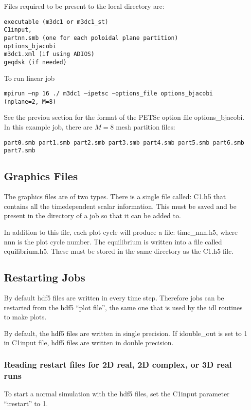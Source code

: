 \noindent
Files required to be present to the local directory are:
\begin{verbatim}
executable (m3dc1 or m3dc1_st)
C1input,
partnn.smb (one for each poloidal plane partition)
options_bjacobi
m3dc1.xml (if using ADIOS)
geqdsk (if needed)
\end{verbatim}

\noindent
To run linear job
\begin{verbatim}
mpirun –np 16 ./ m3dc1 –ipetsc –options_file options_bjacobi (nplane=2, M=8)
\end{verbatim}
\noindent
See the previou section for the format of the PETSc option file options\_bjacobi. In this example job, there are $M=8$ mesh partition files:
\begin{verbatim}
part0.smb part1.smb part2.smb part3.smb part4.smb part5.smb part6.smb part7.smb
\end{verbatim}

\subsection{Graphics Files}
\noindent
The graphics files are of two types. There is a single file called: C1.h5 that contains all the timedependent scalar information. This must be saved and be present in the directory of a job so that it can be added to.

\noindent
In addition to this file, each plot cycle will produce a file: time\_nnn.h5, where nnn is the plot cycle
number. The equilibrium is written into a file called equilibrium.h5. These must be stored in the same
directory as the C1.h5 file.

\subsection{Restarting Jobs}

\noindent
By default  hdf5 files are written in every time step. Therefore jobs can be restarted from the hdf5 “plot file”, the same one that is used by the idl routines to make plots.

\noindent
By default, the hdf5 files are written in single precision. If idouble\_out is set to 1 in C1input file, hdf5 files are written in double precision.

\subsubsection{Reading restart files for 2D real, 2D complex, or 3D real runs}
To start a normal simulation with the hdf5 files, set the C1input parameter “irestart” to 1.

